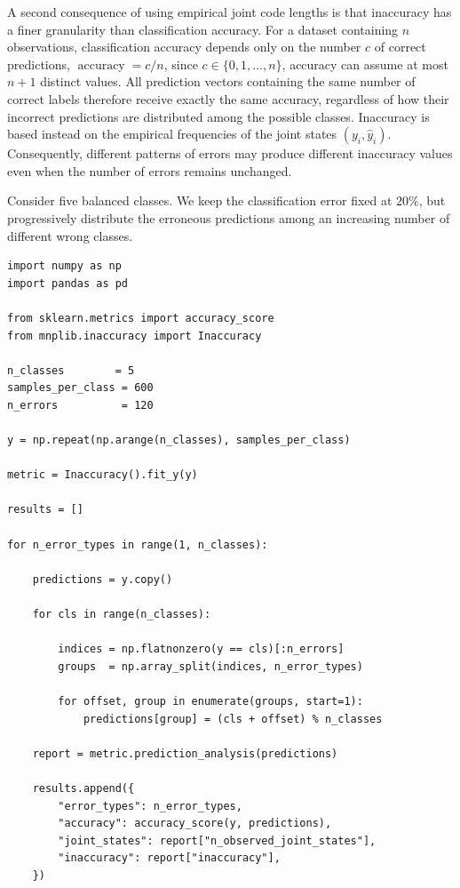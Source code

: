 A second consequence of using empirical joint code lengths is that inaccuracy has a finer granularity than classification accuracy. For a dataset containing $n$ observations, classification accuracy depends only
on the number $c$ of correct predictions, $\operatorname{accuracy} = c/n$, since $c\in\{0,1,\ldots,n\}$, accuracy can assume at most $n+1$ distinct values. All prediction vectors containing the same number of correct labels therefore receive exactly the same accuracy, regardless of how their incorrect predictions are distributed among the possible classes. Inaccuracy is based instead on the empirical frequencies of the joint states $(y_i,\hat y_i)$. Consequently, different patterns of errors may produce different inaccuracy values even when the number of errors remains unchanged.

\begin{example}
\label{ex:machine_learning:inaccuracy:granularity}

Consider five balanced classes. We keep the classification error fixed at $20\%$, but progressively distribute the erroneous predictions among an increasing number of different wrong classes.

\begin{sourcecode}
{\scriptsize \begin{verbatim}
import numpy as np
import pandas as pd

from sklearn.metrics import accuracy_score
from mnplib.inaccuracy import Inaccuracy

n_classes        = 5
samples_per_class = 600
n_errors          = 120

y = np.repeat(np.arange(n_classes), samples_per_class)

metric = Inaccuracy().fit_y(y)

results = []

for n_error_types in range(1, n_classes):

    predictions = y.copy()

    for cls in range(n_classes):

        indices = np.flatnonzero(y == cls)[:n_errors]
        groups  = np.array_split(indices, n_error_types)

        for offset, group in enumerate(groups, start=1):
            predictions[group] = (cls + offset) % n_classes

    report = metric.prediction_analysis(predictions)

    results.append({
        "error_types": n_error_types,
        "accuracy": accuracy_score(y, predictions),
        "joint_states": report["n_observed_joint_states"],
        "inaccuracy": report["inaccuracy"],
    })


\end{verbatim}}
\end{sourcecode}
\end{example}
